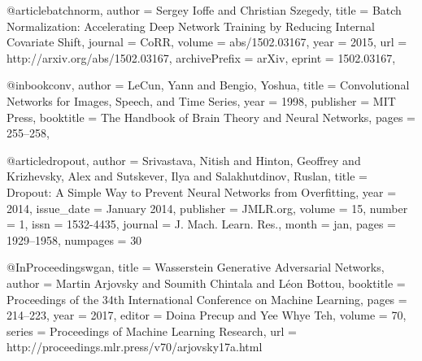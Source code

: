 @article{batchnorm,
    author = {Sergey Ioffe and Christian Szegedy},
    title = {Batch Normalization: Accelerating Deep Network Training by Reducing Internal Covariate Shift},
    journal = {CoRR},
    volume = {abs/1502.03167},
    year = {2015},
    url = {http://arxiv.org/abs/1502.03167},
    archivePrefix = {arXiv},
    eprint = {1502.03167},
}

@inbook{conv, 
    author = {LeCun, Yann and Bengio, Yoshua}, 
    title = {Convolutional Networks for Images, Speech, and Time Series}, 
    year = {1998}, 
    publisher = {MIT Press}, 
    booktitle = {The Handbook of Brain Theory and Neural Networks}, 
    pages = {255–258}, 
}

@article{dropout, 
    author = {Srivastava, Nitish and Hinton, Geoffrey and Krizhevsky, Alex and Sutskever, Ilya and Salakhutdinov, Ruslan}, 
    title = {Dropout: A Simple Way to Prevent Neural Networks from Overfitting},
    year = {2014}, 
    issue_date = {January 2014}, 
    publisher = {JMLR.org}, 
    volume = {15}, 
    number = {1}, 
    issn = {1532-4435}, 
    journal = {J. Mach. Learn. Res.}, 
    month = jan, 
    pages = {1929–1958}, 
    numpages = {30}
}

@InProceedings{wgan,
    title = {{W}asserstein Generative Adversarial Networks},
    author = {Martin Arjovsky and Soumith Chintala and L{\'e}on Bottou},
    booktitle = {Proceedings of the 34th International Conference on Machine Learning},
    pages = {214--223},
    year = {2017},
    editor = {Doina Precup and Yee Whye Teh},
    volume = {70},
    series = {Proceedings of Machine Learning Research},
    url = {http://proceedings.mlr.press/v70/arjovsky17a.html}
}